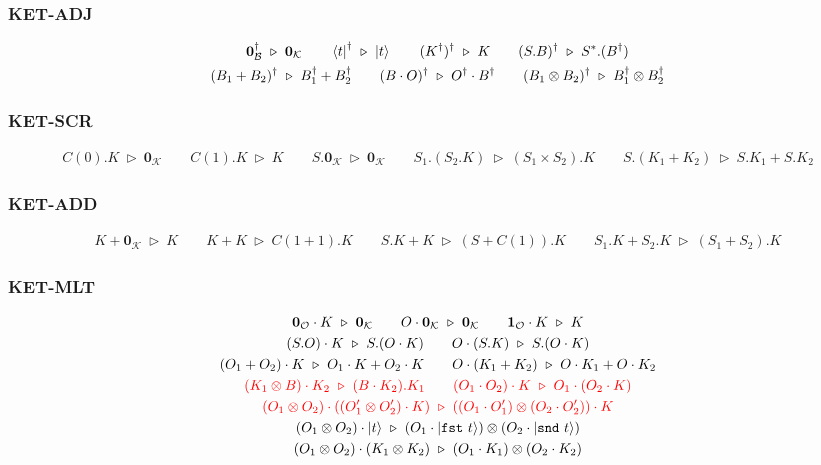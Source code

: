 \documentclass[manuscript, review, timestamp]{acmart}
\newcommand*{\fst}{\texttt{fst}}
\newcommand*{\snd}{\texttt{snd}}
\newcommand*{\reduce}{\ \triangleright\ }
\begin{document}
\subsubsection*{\textsf{KET-ADJ}}
\begin{gather*}
  \textbf{0}_\mathcal{B}^\dagger \reduce \textbf{0}_\mathcal{K}
  \qquad
  \bra{t}^\dagger \reduce \ket{t}
  \qquad
  (K^\dagger)^\dagger \reduce K
  \qquad
  (S.B)^\dagger \reduce S^*.(B^\dagger) \\
  (B_1 + B_2)^\dagger \reduce B_1^\dagger + B_2^\dagger
  \qquad
  (B \cdot O)^\dagger \reduce O^\dagger \cdot B^\dagger
  \qquad
  (B_1 \otimes B_2)^\dagger \reduce B_1^\dagger \otimes B_2^\dagger
\end{gather*}

\subsubsection*{\textsf{KET-SCR}}
\begin{gather*}
  C(0).K \reduce \textbf{0}_{\mathcal{K}}
  \qquad
  C(1).K \reduce K
  \qquad
  S.\textbf{0}_\mathcal{K} \reduce \textbf{0}_\mathcal{K}
  \qquad
  S_1.(S_2.K) \reduce (S_1 \times S_2).K
  \qquad
  S.(K_1 + K_2) \reduce S.K_1 + S.K_2
\end{gather*}

\subsubsection*{\textsf{KET-ADD}}
\begin{gather*}
  K + \textbf{0}_\mathcal{K} \reduce K
  \qquad
  K + K \reduce C(1 + 1).K
  \qquad
  S.K + K \reduce (S + C(1)).K
  \qquad
  S_1.K + S_2.K \reduce (S_1 + S_2).K
\end{gather*}

\subsubsection*{\textsf{KET-MLT}}
\begin{gather*}
  \textbf{0}_\mathcal{O} \cdot K \reduce \textbf{0}_\mathcal{K}
  \qquad
  O \cdot \mathbf{0}_{\mathcal{K}} \reduce \mathbf{0}_{\mathcal{K}}
  \qquad
  \textbf{1}_\mathcal{O} \cdot K \reduce K \\
  (S.O) \cdot K \reduce S.(O \cdot K)
  \qquad
  O \cdot (S.K) \reduce S.(O \cdot K) \\
  (O_1 + O_2) \cdot K \reduce O_1 \cdot K + O_2 \cdot K
  \qquad
  O \cdot (K_1 + K_2) \reduce O \cdot K_1 + O \cdot K_2 \\
  \textcolor{red}{ (K_1 \otimes B) \cdot K_2 \reduce (B \cdot K_2).K_1}
  \qquad
  \textcolor{red}{ (O_1 \cdot O_2) \cdot K \reduce O_1 \cdot (O_2 \cdot K)} \\
  \textcolor{red}{ (O_1 \otimes O_2) \cdot ((O_1' \otimes O_2') \cdot K) \reduce ((O_1 \cdot O_1') \otimes (O_2 \cdot O_2')) \cdot K} \\
  (O_1 \otimes O_2) \cdot \ket{t} \reduce (O_1 \cdot \ket{\fst\ t}) \otimes (O_2 \cdot \ket{\snd\ t}) \\
  (O_1 \otimes O_2) \cdot (K_1 \otimes K_2) \reduce (O_1 \cdot K_1) \otimes (O_2 \cdot K_2)
\end{gather*}
\end{document}
